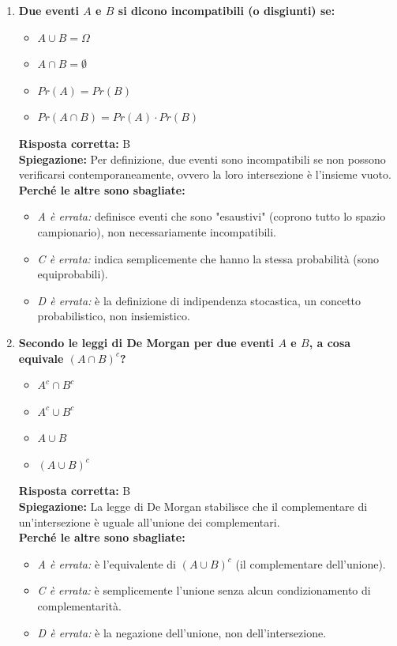 \documentclass[12pt, a4paper]{article}
\begin{document}
\begin{enumerate}[label=\textbf{\arabic*.}]
    \item \textbf{Due eventi $A$ e $B$ si dicono incompatibili (o disgiunti) se:}
    \begin{itemize}
        \item[A)] $A \cup B = \Omega$
        \item[B)] $A \cap B = \emptyset$
        \item[C)] $Pr(A) = Pr(B)$
        \item[D)] $Pr(A \cap B) = Pr(A) \cdot Pr(B)$
    \end{itemize}
    \textbf{Risposta corretta:} B \\
    \textbf{Spiegazione:} Per definizione, due eventi sono incompatibili se non possono verificarsi contemporaneamente, ovvero la loro intersezione è l'insieme vuoto. \\
    \textbf{Perché le altre sono sbagliate:}
    \begin{itemize}
        \item \textit{A è errata:} definisce eventi che sono "esaustivi" (coprono tutto lo spazio campionario), non necessariamente incompatibili.
        \item \textit{C è errata:} indica semplicemente che hanno la stessa probabilità (sono equiprobabili).
        \item \textit{D è errata:} è la definizione di indipendenza stocastica, un concetto probabilistico, non insiemistico.
    \end{itemize}

    \item \textbf{Secondo le leggi di De Morgan per due eventi $A$ e $B$, a cosa equivale $(A \cap B)^c$?}
    \begin{itemize}
        \item[A)] $A^c \cap B^c$
        \item[B)] $A^c \cup B^c$
        \item[C)] $A \cup B$
        \item[D)] $(A \cup B)^c$
    \end{itemize}
    \textbf{Risposta corretta:} B \\
    \textbf{Spiegazione:} La legge di De Morgan stabilisce che il complementare di un'intersezione è uguale all'unione dei complementari. \\
    \textbf{Perché le altre sono sbagliate:}
    \begin{itemize}
        \item \textit{A è errata:} è l'equivalente di $(A \cup B)^c$ (il complementare dell'unione).
        \item \textit{C è errata:} è semplicemente l'unione senza alcun condizionamento di complementarità.
        \item \textit{D è errata:} è la negazione dell'unione, non dell'intersezione.
    \end{itemize}


\end{enumerate}
\end{document}
